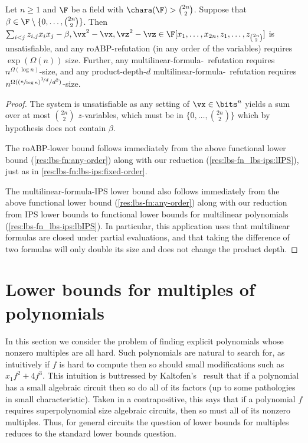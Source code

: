\documentclass{toc}
\begin{document}
\begin{corollary}\label{res:lbs-fn:lbs-ips:vary-order}
  Let $n\ge 1$ and $\F$ be a field with $\chara(\F)>\binom{2n}{2}$.  Suppose that $\beta\in\F\setminus\{0,\ldots,\binom{2n}{2}\}$.  Then $\sum_{i<j} z_{i,j}x_ix_j-\beta,\vx^2-\vx,\vz^2-\vz\in\F[x_1,\ldots,x_{2n},z_1,\ldots,z_{\binom{2n}{2}}]$ is unsatisfiable, and any roABP-\lIPS refutation (in any order of the variables) requires
%
 $\exp(\Omega(n))$ size.   %
Further, any multilinear-formula-\IPS\ refutation requires $n^{\Omega(\log n)}$-size, and any product-depth-$d$ multilinear-formula-\IPS\ refutation requires $n^{\Omega((\nicefrac{n}{\log n})^{\nicefrac{1}{d}}/d^2)}$-size.
\end{corollary}
\begin{proof}
        The system is unsatisfiable as any setting of $\vx\in\bits^n$ yields a sum over at most $\binom{2n}{2}$ $z$-variables, which must be in $\{0,\ldots,\binom{2n}{2}\}$ which by hypothesis does not contain $\beta$.

        The roABP-\lIPS lower bound follows immediately from the above functional lower bound (\autoref{res:lbs-fn:any-order}) along with our reduction (\autoref{res:lbs-fn_lbs-ips:lIPS}), just as in \autoref{res:lbs-fn:lbs-ips:fixed-order}.

        The multilinear-formula-IPS lower bound also follows immediately from the above functional lower bound (\autoref{res:lbs-fn:any-order}) along with our reduction from IPS lower bounds to functional lower bounds for multilinear polynomials (\autoref{res:lbs-fn_lbs-ips:lbIPS}).  In particular, this application uses that multilinear formulas are closed under partial evaluations, and that taking the difference of two formulas will only double its size and does not change the product depth.
\end{proof}

\section{Lower bounds for multiples of polynomials}\label{sec:lbs-mult}

In this section we consider the problem of finding explicit polynomials whose nonzero multiples are all hard. Such polynomials are natural to search for, as intuitively if $f$ is hard to compute then so should small modifications such as $x_1f^2+4f^3$. This intuition is buttressed by Kaltofen's~\cite{Kaltofen89} result that if a polynomial has a small algebraic circuit then so do all of its factors (up to some pathologies in small characteristic). Taken in a contrapositive, this says that if a polynomial $f$ requires superpolynomial size algebraic circuits, then so must all of its nonzero multiples.  Thus, for general circuits the question of lower bounds for multiples reduces to the standard lower bounds question. %
\end{document}
